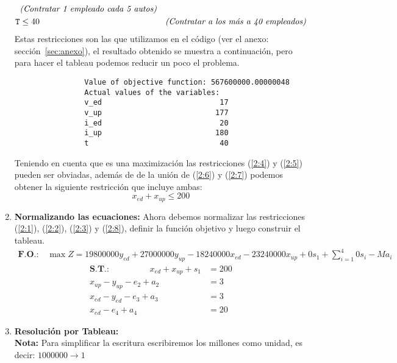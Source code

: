 \documentclass[spanish, fleqn]{article}
\begin{document}
\begin{enumerate}
\begin{align}
				&\emph{(Contratar 1 empleado cada 5 autos)} \label{2:6}\\
				\texttt{T} &\leq 40 &\emph{(Contratar a los más a 40 empleados)}
				\label{2:7}
			\end{align}
			Estas restricciones son las que utilizamos en el código (ver el 
			anexo: sección~\ref{sec:anexo}), el resultado obtenido se muestra
			a continuación, pero para hacer el tableau podemos reducir un poco
			el problema.
			\begin{verbatim}
				Value of objective function: 567600000.00000048
				Actual values of the variables:
				v_ed                           17
				v_up                          177
				i_ed                           20
				i_up                          180
				t                              40
			\end{verbatim}
			Teniendo en cuenta que es una maximización las restricciones 
			(\ref{2:4}) y (\ref{2:5}) pueden ser obviadas, además de de la unión
			de (\ref{2:6}) y (\ref{2:7}) podemos obtener la siguiente
			restricción que incluye ambas:
			\begin{equation} 
				\label{2:8}
				x_{ed} + x_{up} \leq 200
			\end{equation}
		\item
			\textbf{Normalizando las ecuaciones:} Ahora debemos normalizar las
			restricciones (\ref{2:1}), (\ref{2:2}), (\ref{2:3}) y (\ref{2:8}),
			definir la función objetivo y luego construir el tableau.
			\begin{align*}
				\textbf{F.O.:} \quad
				\max{Z} = 19800000  y_{ed} + 
						  27000000  y_{up} - 
						  18240000  x_{ed} - 
						  23240000  x_{up} +
						  0s_1 + \sum_{i=1}^{4} 0s_i -Ma_i
			\end{align*}
			\vspace{-1cm}
			\begin{align*}
				\textbf{S.T.:} \hspace{2cm}
				x_{ed} + x_{up} + s_1&= 200 \\
				x_{up} - y_{up} - e_2 + a_2 &= 3 \\
				x_{ed} - y_{ed} - e_3 + a_3 &= 3 \\
				x_{ed} - e_4 + a_4 &= 20
			\end{align*}
		\item
			\textbf{Resolución por Tableau:}\\
			\textbf{Nota:} Para simplificar la escritura escribiremos los
			millones como unidad, es decir: $1000000 \rightarrow 1$
	\end{enumerate}
	\newpage
\end{document}
